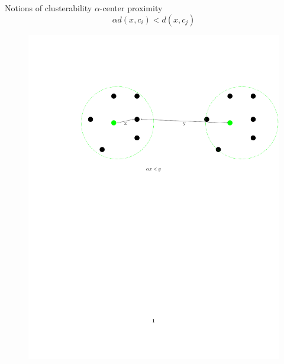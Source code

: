 \documentclass{beamer}
\newcommand{\mc}{\mathcal}
\begin{document}
\begin{frame}{Notions of clusterability}
   $\alpha$-center proximity\\
   $$\alpha d(x, c_i) < d(x, c_j)$$ 
   \begin{figure}
	  \includegraphics[trim = 0 0 0 100, clip, width=\linewidth]{1.pdf}
   \end{figure}
   
\end{frame}

\end{document}
